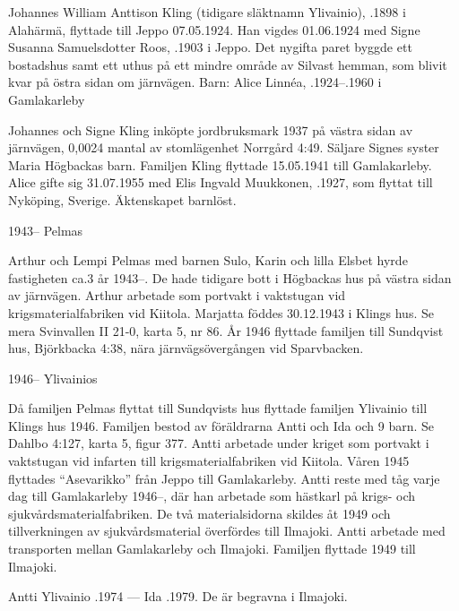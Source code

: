 
Johannes William Anttison Kling (tidigare släktnamn Ylivainio), .1898 i Alahärmä, flyttade till Jeppo 07.05.1924. Han vigdes 01.06.1924 med Signe Susanna Samuelsdotter Roos, .1903 i Jeppo. Det nygifta paret byggde ett bostadshus samt ett uthus 	på ett mindre område av Silvast hemman, som blivit kvar på östra sidan om järnvägen.
Barn: Alice Linnéa, .1924--.1960 i Gamlakarleby

Johannes och Signe Kling inköpte jordbruksmark 1937 på västra sidan av	järnvägen, 0,0024 mantal av stomlägenhet Norrgård 4:49. Säljare Signes syster Maria Högbackas barn.	Familjen Kling flyttade 15.05.1941 till Gamlakarleby. Alice gifte sig 31.07.1955 med Elis Ingvald Muukkonen, .1927, som flyttat till Nyköping, Sverige. Äktenskapet barnlöst.


1943--	Pelmas

Arthur och Lempi Pelmas med barnen Sulo, Karin och lilla Elsbet hyrde fastigheten ca.3 år 1943--. De hade tidigare bott i Högbackas hus på västra sidan av järnvägen. Arthur arbetade som portvakt i vaktstugan vid 	krigsmaterialfabriken vid Kiitola. Marjatta föddes 30.12.1943 i Klings hus. Se mera Svinvallen II 21-0, karta 5, nr 86. År 1946 flyttade familjen till Sundqvist hus, Björkbacka 4:38, nära järnvägsövergången vid Sparvbacken.

1946--	Ylivainios

Då familjen Pelmas flyttat till Sundqvists hus flyttade familjen Ylivainio till Klings hus 1946. Familjen bestod av föräldrarna Antti och Ida och 9 barn. Se Dahlbo 4:127, karta 5, figur 377. Antti arbetade under kriget som portvakt i vaktstugan vid infarten till krigsmaterialfabriken vid Kiitola. Våren 1945 flyttades ``Asevarikko'' från Jeppo till Gamlakarleby. Antti reste med tåg varje dag till Gamlakarleby 1946--, där han arbetade som hästkarl på krigs- och sjukvårdsmaterialfabriken. De två materialsidorna skildes åt 1949 och tillverkningen av sjukvårdsmaterial överfördes till Ilmajoki. Antti arbetade med transporten mellan Gamlakarleby och Ilmajoki. Familjen flyttade 1949 till Ilmajoki.

Antti Ylivainio .1974  ---  Ida .1979. De är begravna i Ilmajoki.



